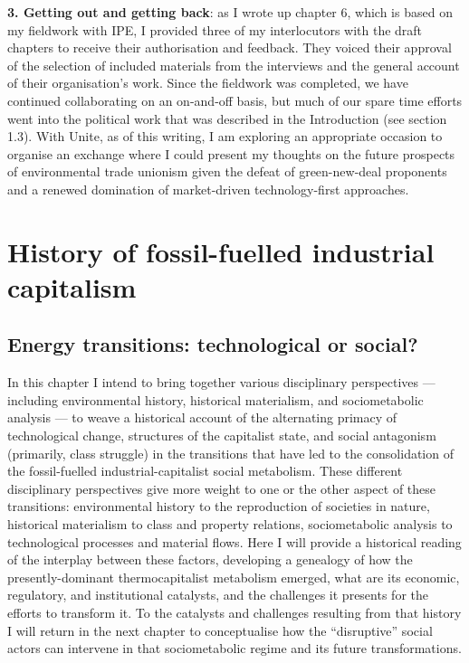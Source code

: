 \documentclass[a4paper, nobind]{templates/ociamthesis}
\begin{document}
\textbf{3. Getting out and getting back}: as I wrote up chapter 6, which is based on my fieldwork with IPE, I provided three of my interlocutors with the draft chapters to receive their authorisation and feedback. They voiced their approval of the selection of included materials from the interviews and the general account of their organisation's work. Since the fieldwork was completed, we have continued collaborating on an on-and-off basis, but much of our spare time efforts went into the political work that was described in the Introduction (see section 1.3). With Unite, as of this writing, I am exploring an appropriate occasion to organise an exchange where I could present my thoughts on the future prospects of environmental trade unionism given the defeat of green-new-deal proponents and a renewed domination of market-driven technology-first approaches.

\hypertarget{history-of-fossil-fuelled-industrial-capitalism}{%
\chapter{History of fossil-fuelled industrial capitalism}\label{history-of-fossil-fuelled-industrial-capitalism}}

\minitoc

\hypertarget{energy-transitions-technological-or-social}{%
\section{Energy transitions: technological or social?}\label{energy-transitions-technological-or-social}}

In this chapter I intend to bring together various disciplinary perspectives --- including environmental history, historical materialism, and sociometabolic analysis --- to weave a historical account of the alternating primacy of technological change, structures of the capitalist state, and social antagonism (primarily, class struggle) in the transitions that have led to the consolidation of the fossil-fuelled industrial-capitalist social metabolism. These different disciplinary perspectives give more weight to one or the other aspect of these transitions: environmental history to the reproduction of societies in nature, historical materialism to class and property relations, sociometabolic analysis to technological processes and material flows. Here I will provide a historical reading of the interplay between these factors, developing a genealogy of how the presently-dominant thermocapitalist metabolism emerged, what are its economic, regulatory, and institutional catalysts, and the challenges it presents for the efforts to transform it. To the catalysts and challenges resulting from that history I will return in the next chapter to conceptualise how the ``disruptive'' social actors can intervene in that sociometabolic regime and its future transformations.
\end{document}
